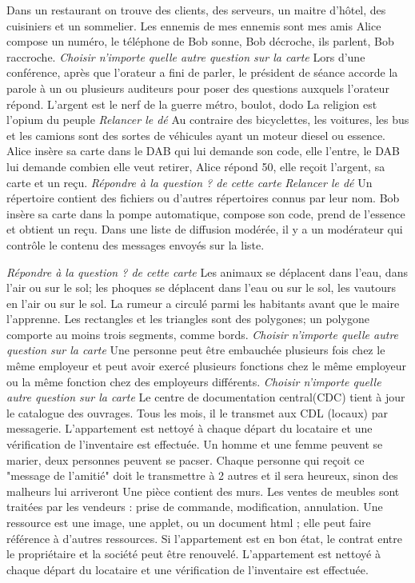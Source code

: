 \newrow
\umlpiccard
{\challenge Dans un restaurant on trouve des clients, des serveurs, un maitre d'hôtel, des cuisiniers et un sommelier.
}
{\challenge Les ennemis de mes ennemis sont mes amis
}
{Alice compose un numéro, le téléphone de Bob sonne, Bob décroche, ils parlent, Bob raccroche.
}
{\emph{Choisir n'importe quelle autre question sur la carte}
}
\umlpiccard
{\challenge Lors d'une conférence, après que l'orateur a fini de parler, le président de séance accorde la parole à un ou plusieurs auditeurs pour poser des questions auxquels l'orateur répond.
}
{L'argent est le nerf de la guerre 
}
{\challenge métro, boulot, dodo
}
{\challenge La religion est l'opium du peuple
}
\umlpiccard
{\emph{Relancer le dé}
}
{Au contraire des bicyclettes, les voitures, les bus et les camions sont des sortes de véhicules ayant un moteur diesel ou essence.
}
{Alice insère sa carte dans le DAB qui lui demande son code, elle l'entre, le DAB lui demande combien elle veut retirer, Alice répond 50, elle reçoit l'argent, sa carte et un reçu.
}
{\emph{Répondre à la question ? de cette carte} 
}
\umlpiccard
{\emph{Relancer le dé}
}
{Un répertoire contient des fichiers ou d'autres répertoires connus par leur nom.
}
{Bob insère sa carte dans la pompe automatique, compose son code, prend de l'essence et obtient un reçu.
}
{Dans une liste de diffusion modérée, il y a un modérateur qui contrôle le contenu des messages envoyés sur la liste.
}

\newrow
\umlpiccard
{\emph{Répondre à la question ? de cette carte} 
}
{\challenge Les animaux se déplacent dans l'eau, dans l'air ou sur le sol; les phoques se déplacent dans l'eau ou sur le sol, les vautours en l'air ou sur le sol.
}
{\challenge La rumeur a circulé parmi les habitants avant que le maire l'apprenne.
}
{Les rectangles et les triangles sont des polygones; un polygone comporte au moins trois segments, comme bords.
}
\umlpiccard
{\emph{Choisir n'importe quelle autre question sur la carte}
}
{\challenge Une personne peut être embauchée plusieurs fois chez le même employeur et peut avoir exercé plusieurs fonctions chez le même employeur ou la même fonction chez des employeurs différents.
}
{\emph{Choisir n'importe quelle autre question sur la carte}
}
{Le centre de documentation central(CDC) tient à jour le catalogue des ouvrages. Tous les mois, il le transmet aux CDL (locaux) par messagerie.
}
\umlpiccard
{L'appartement est nettoyé à chaque départ du locataire et une vérification de l'inventaire est effectuée.
}
{\challenge Un homme et une femme peuvent se marier, deux personnes peuvent se pacser.
}
{Chaque personne qui reçoit ce "message de l'amitié" doit le transmettre à 2 autres et il sera heureux, sinon des malheurs lui arriveront 
}
{Une pièce contient des murs.
}
\umlpiccard
{Les ventes de meubles sont traitées par les vendeurs : prise de commande, modification, annulation.
}
{Une ressource est une image, une applet, ou un document html ; elle peut faire référence à d'autres ressources.
}
{Si l'appartement est en bon état, le contrat entre le propriétaire et la société peut être renouvelé.
}
{L'appartement est nettoyé à chaque départ du locataire et une vérification de l'inventaire est effectuée.
}

